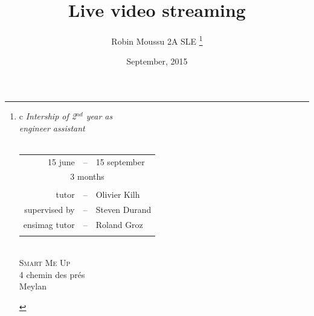 \documentclass[a4paper,11pt]{custom}
\newcommand{\smu}{\textsc{Smart Me Up}}
\begin{document}



\title{
  Live video streaming
}
\author{
  Robin Moussu 2A SLE
  \thanks{
  \begin{tabular}{c}
    \textit{Intership of 2$^{nd}$ year as}\\
    \textit{engineer assistant}\\
    \vspace{2em}\\
    \begin{tabular}{rcl}
      15 june &--& 15 september\\
      \multicolumn{3}{c}{3 months}\\
      \\
      tutor &--& Olivier Kilh \\
      supervised by &--& Steven Durand \\
      ensimag tutor &--& Roland Groz\\
      \\
    \end{tabular}
    \vspace{2em}\\
    \smu\\
    4 chemin des prés\\
    Meylan\\
  \end{tabular}
  }
}
\date{
  September, 2015
}
\maketitle

\end{document}
